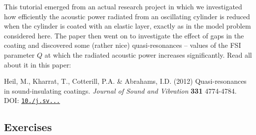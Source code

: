 \begin{DoxyItemize}
\item This tutorial emerged from an actual research project in which we investigated how efficiently the acoustic power radiated from an oscillating cylinder is reduced when the cylinder is coated with an elastic layer, exactly as in the model problem considered here. The paper then went on to investigate the effect of gaps in the coating and discovered some (rather nice) quasi-\/resonances -- values of the F\+SI parameter $ Q $ at which the radiated acoustic power increases significantly. Read all about it in this paper\+: ~\newline
~\newline

\begin{DoxyItemize}
\item Heil, M., Kharrat, T., Cotterill, P.\+A. \& Abrahams, I.\+D. (2012) Quasi-\/resonances in sound-\/insulating coatings. {\itshape Journal of Sound and Vibration} {\bfseries 331} 4774-\/4784. D\+OI\+: \href{http://dx.doi.org/10.1016/j.jsv.2012.05.029}{\tt 10./j.sv...}
\end{DoxyItemize}
\end{DoxyItemize}



\hypertarget{index_ex}{}\subsection{Exercises}\label{index_ex}

